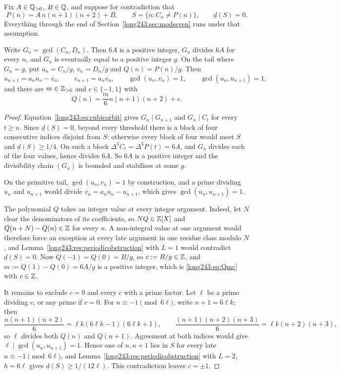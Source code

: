 \documentclass[11pt]{article}
\begin{document}
Fix $A\in\mathbb{Q}_{>0}$, $B\in\mathbb{Q}$, and suppose for contradiction that
\[
 P(n)=A\,n(n+1)(n+2)+B,
 \qquad S=\{n:C_n\ne P(n)\},
 \qquad \underline d(S)=0 .
\]
Everything through the end of Section~\ref{long243:sec:modseven} runs under that
assumption.

\begin{lemma}\label{long243:res:gcdshape}
Write $G_n=\gcd(C_n,D_n)$.  Then $6A$ is a positive integer, $G_n$ divides
$6A$ for every $n$, and $G_n$ is eventually equal to a positive integer
$g$.  On the tail where $G_n=g$, put $u_n=C_n/g$, $v_n=D_n/g$ and
$Q(n)=P(n)/g$.  Then
\begin{equation}\label{long243:eq:primitivetail}
 u_{n+1}=a_nu_n-v_n,\qquad v_{n+1}=a_nv_n,\qquad \gcd(u_n,v_n)=1,
 \qquad\gcd(u_n,u_{n+1})=1,
\end{equation}
and there are $m\in\mathbb{Z}_{>0}$ and $c\in\{-1,1\}$ with
\begin{equation}\label{long243:eq:Qmc}
 Q(n)=\frac m6n(n+1)(n+2)+c .
\end{equation}
\end{lemma}

\begin{proof}
Equation~\eqref{long243:eq:cubicorbit} gives $G_n\mid G_{n+1}$ and $G_n\mid C_t$ for
every $t\ge n$.  Since $\underline d(S)=0$, beyond every threshold there is a block of four
consecutive indices disjoint from $S$: otherwise every block of four would meet
$S$ and $\underline d(S)\ge1/4$.  On such a block $\Delta^3C_t=\Delta^3P(t)=6A$, and
$G_n$ divides each of the four values, hence divides $6A$.  So $6A$
is a positive integer and the divisibility chain $(G_n)$ is bounded and
stabilises at some $g$.

On the primitive tail, $\gcd(u_n,v_n)=1$ by construction, and a prime dividing
$u_n$ and $u_{n+1}$ would divide $v_n=a_nu_n-u_{n+1}$, which gives
$\gcd(u_n,u_{n+1})=1$.

The polynomial $Q$ takes an integer value at every integer argument.  Indeed,
let $N$ clear the denominators of its coefficients, so $NQ\in\mathbb{Z}[X]$ and
$Q(n+N)-Q(n)\in\mathbb{Z}$ for every $n$.  A non-integral value at one argument would
therefore force an exception at every late argument in one residue class modulo
$N$, and Lemma~\ref{long243:res:periodicobstruction} with $L=1$ would contradict
$\underline d(S)=0$.  Now $Q(-1)=Q(0)=B/g$, so $c:=B/g\in\mathbb{Z}$, and
$m:=Q(1)-Q(0)=6A/g$ is a positive integer, which is \eqref{long243:eq:Qmc} with
$c\in\mathbb{Z}$.

It remains to exclude $c=0$ and every $c$ with a prime factor.  Let $\ell$ be a
prime dividing $c$, or any prime if $c=0$.  For $n\equiv-1\pmod{6\ell}$, write
$n+1=6\ell k$; then
\[
 \frac{n(n+1)(n+2)}6=\ell k(6\ell k-1)(6\ell k+1),
 \qquad
 \frac{(n+1)(n+2)(n+3)}6=\ell k(n+2)(n+3),
\]
so $\ell$ divides both $Q(n)$ and $Q(n+1)$.  Agreement at both indices would
give $\ell\mid\gcd(u_n,u_{n+1})=1$.  Hence one of $n,n+1$ lies in $S$ for every
late $n\equiv-1\pmod{6\ell}$, and Lemma~\ref{long243:res:periodicobstruction} with
$L=2$, $h=6\ell$ gives $\underline d(S)\ge1/(12\ell)$.  This contradiction
leaves $c=\pm1$.
\end{proof}
\end{document}
